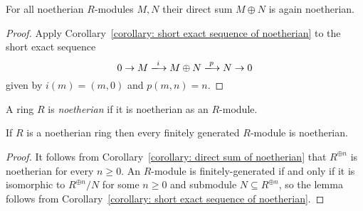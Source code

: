 \begin{corollary}
  \label{corollary: direct sum of noetherian}
  For all noetherian $R$-modules $M, N$ their direct sum $M \oplus N$ is again noetherian.
\end{corollary}


\begin{proof}
  Apply Corollary~\ref{corollary: short exact sequence of noetherian} to the short exact sequence
  \[
                        0
    \to                 M
    \xlongrightarrow{i} M \oplus N
    \xlongrightarrow{p} N
    \to                 0
  \]
  given by $i(m) = (m,0)$ and $p(m,n) = n$.
\end{proof}


\begin{definition}
  A ring $R$ is \emph{noetherian} if it is noetherian as an $R$-module.
\end{definition}


\begin{lemma}
  If $R$ is a noetherian ring then every finitely generated $R$-module is noetherian.
\end{lemma}


\begin{proof}
  It follows from Corollary~\ref{corollary: direct sum of noetherian} that $R^{\oplus n}$ is noetherian for every $n \geq 0$.
  An $R$-module is finitely-generated if and only if it is isomorphic to $R^{\oplus n}/N$ for some $n \geq 0$ and submodule $N \subseteq R^{\oplus n}$, so the lemma follows from Corollary~\ref{corollary: short exact sequence of noetherian}.
\end{proof}


